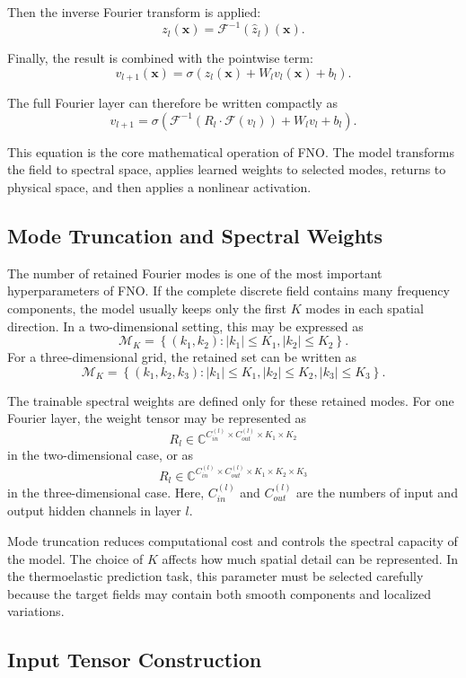 \documentclass[14pt]{extarticle}
\begin{document}
Then the inverse Fourier transform is applied:
\[
z_l(\mathbf{x})
=
\mathcal{F}^{-1}
\left(
\hat{z}_l
\right)
(\mathbf{x}).
\]

Finally, the result is combined with the pointwise term:
\[
v_{l+1}(\mathbf{x})
=
\sigma
\left(
z_l(\mathbf{x})
+
W_l v_l(\mathbf{x})
+
b_l
\right).
\]

The full Fourier layer can therefore be written compactly as
\[
v_{l+1}
=
\sigma
\left(
\mathcal{F}^{-1}
\left(
R_l \cdot \mathcal{F}(v_l)
\right)
+
W_l v_l
+
b_l
\right).
\]

This equation is the core mathematical operation of FNO. The model transforms the field to spectral space, applies learned weights to selected modes, returns to physical space, and then applies a nonlinear activation.

\subsection{Mode Truncation and Spectral Weights}

The number of retained Fourier modes is one of the most important hyperparameters of FNO. If the complete discrete field contains many frequency components, the model usually keeps only the first \(K\) modes in each spatial direction. In a two-dimensional setting, this may be expressed as
\[
\mathcal{M}_K
=
\left\{
(k_1, k_2)
:
|k_1| \leq K_1,
|k_2| \leq K_2
\right\}.
\]
For a three-dimensional grid, the retained set can be written as
\[
\mathcal{M}_K
=
\left\{
(k_1, k_2, k_3)
:
|k_1| \leq K_1,
|k_2| \leq K_2,
|k_3| \leq K_3
\right\}.
\]

The trainable spectral weights are defined only for these retained modes. For one Fourier layer, the weight tensor may be represented as
\[
R_l
\in
\mathbb{C}^{C_{in}^{(l)} \times C_{out}^{(l)} \times K_1 \times K_2}
\]
in the two-dimensional case, or as
\[
R_l
\in
\mathbb{C}^{C_{in}^{(l)} \times C_{out}^{(l)} \times K_1 \times K_2 \times K_3}
\]
in the three-dimensional case. Here, \(C_{in}^{(l)}\) and \(C_{out}^{(l)}\) are the numbers of input and output hidden channels in layer \(l\).

Mode truncation reduces computational cost and controls the spectral capacity of the model. The choice of \(K\) affects how much spatial detail can be represented. In the thermoelastic prediction task, this parameter must be selected carefully because the target fields may contain both smooth components and localized variations.

\subsection{Input Tensor Construction}
\end{document}
